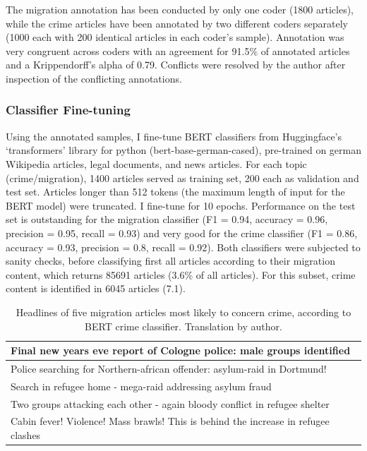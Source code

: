 \documentclass[
]{article}
\begin{document}
The migration annotation has been conducted by only one coder (1800 articles), while the crime articles have been annotated by two different coders separately (1000 each with 200 identical articles in each coder's sample). Annotation was very congruent across coders with an agreement for 91.5\% of annotated articles and a Krippendorff's alpha of 0.79. Conflicts were resolved by the author after inspection of the conflicting annotations.

\pagebreak

\hypertarget{classifier-fine-tuning}{%
\subsubsection{Classifier Fine-tuning}\label{classifier-fine-tuning}}

Using the annotated samples, I fine-tune BERT classifiers from Huggingface's `transformers' library for python (bert-base-german-cased), pre-trained on german Wikipedia articles, legal documents, and news articles. For each topic (crime/migration), 1400 articles served as training set, 200 each as validation and test set. Articles longer than 512 tokens (the maximum length of input for the BERT model) were truncated. I fine-tune for 10 epochs. Performance on the test set is outstanding for the migration classifier (F1 = 0.94, accuracy = 0.96, precision = 0.95, recall = 0.93) and very good for the crime classifier (F1 = 0.86, accuracy = 0.93, precision = 0.8, recall = 0.92). Both classifiers were subjected to sanity checks, before classifying first all articles according to their migration content, which returns 85691 articles (3.6\% of all articles). For this subset, crime content is identified in 6045 articles (7.1).

\begin{table}[!h]
\centering
\begin{tabular}{|p{12cm}|}
\hline
Final new years eve report of Cologne police: male groups identified \\ \hline
Police searching for Northern-african offender: asylum-raid in Dortmund! \\ \hline
Search in refugee home - mega-raid addressing asylum fraud \\ \hline
Two groups attacking each other - again bloody conflict in refugee shelter \\ \hline
Cabin fever! Violence! Mass brawls! This is behind the increase in refugee clashes \\ \hline
\end{tabular}
\caption{Headlines of five migration articles most likely to concern crime, according to BERT crime classifier. Translation by author.}
\label{tab:exampleArticles}
\end{table}
\end{document}
